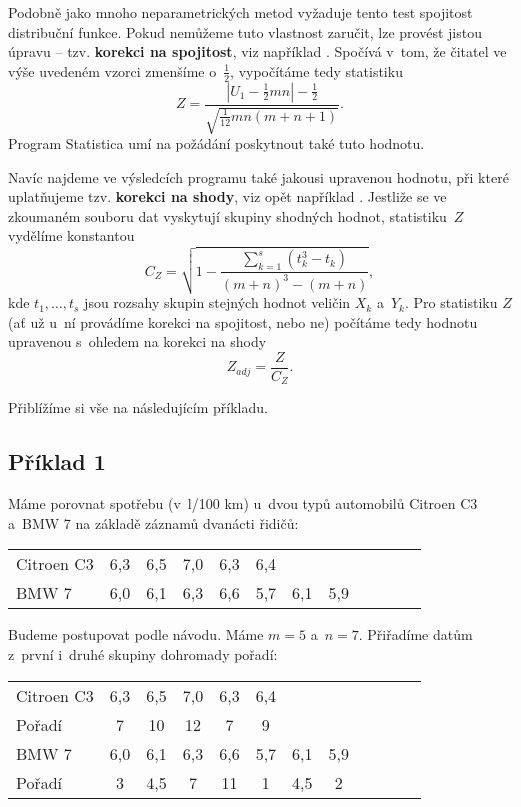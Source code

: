 Podobně jako mnoho neparametrických metod vyžaduje tento test spojitost distribuční funkce. Pokud nemůžeme tuto vlastnost zaručit, lze provést jistou úpravu -- tzv. {\bf korekci na spojitost}, viz například \cite{3}. Spočívá v~tom, že čitatel ve výše uvedeném vzorci zmenšíme o~$\frac12$, vypočítáme tedy statistiku
$$Z=\frac{|U_1-\frac12mn|-\frac12}{\sqrt{\frac1{12}mn(m+n+1)}} .$$
Program Statistica umí na požádání poskytnout také tuto hodnotu.

Navíc najdeme ve výsledcích programu také jakousi upravenou hodnotu, při které uplatňujeme  tzv. {\bf korekci na shody}, viz opět například \cite{3}.
Jestliže se ve zkoumaném souboru dat vyskytují skupiny shodných hodnot, statistiku~$Z$ vydělíme konstantou
$$ C_Z=\sqrt{1-\frac{\sum_{k=1}^s (t_k^3-t_k)}{(m+n)^3-(m+n)}} , $$
kde $t_1,\dots , t_s$ jsou rozsahy skupin stejných hodnot veličin $X_k$ a~$Y_k$. Pro statistiku $Z$ (ať už u~ní provádíme korekci na spojitost, nebo ne)
počítáme tedy hodnotu upravenou s~ohledem na korekci na shody
$$ Z_{adj}=\frac{Z}{C_{Z}}. $$

Přiblížíme si vše na následujícím příkladu.

\subsection*{Příklad 1}
Máme porovnat spotřebu (v~l/100 km) u~dvou typů automobilů Citroen C3 a~BMW 7 na základě záznamů dvanácti řidičů:

\begin{table}[!ht]
\centering
\begin{tabular}{lccccccccccc}
Citroen C3  & 6,3 & 6,5 & 7,0 & 6,3 & 6,4 &     & \\[3pt]
BMW 7       & 6,0 & 6,1 & 6,3 & 6,6 & 5,7 & 6,1 & 5,9
\end{tabular}
\end{table}

Budeme postupovat podle návodu. Máme $m=5$ a~$n=7$. Přiřadíme datům z~první i~druhé skupiny dohromady pořadí:

\begin{table}[!ht]
\centering
\begin{tabular}{lccccccccccc}
Citroen C3  & 6,3 & 6,5 & 7,0 & 6,3 & 6,4 &     & \\
Pořadí      & 7   &  10 &  12 &  7  &  9  &     & \\
\hline
BMW 7       & 6,0 & 6,1 & 6,3 & 6,6 & 5,7 & 6,1 & 5,9 \\
Pořadí      & 3   & 4,5 &  7  & 11  &  1  & 4,5 & 2
\end{tabular}
\end{table}

